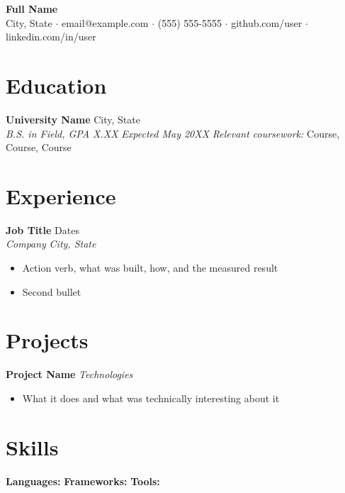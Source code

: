 \documentclass[letterpaper,10pt]{article}
\newcommand{\entry}[4]{\textbf{#1} \hfill #2 \\ \textit{#3} \hfill \textit{#4} \vspace{0.2em}}
\begin{document}
\begin{center}
{\LARGE \textbf{Full Name}}\\[0.3em]
City, State $\cdot$ email@example.com $\cdot$ (555) 555-5555 $\cdot$ github.com/user $\cdot$ linkedin.com/in/user
\end{center}

\section{Education}
\entry{University Name}{City, State}{B.S. in Field, GPA X.XX}{Expected May 20XX}
\textit{Relevant coursework:} Course, Course, Course

\section{Experience}
\entry{Job Title}{Dates}{Company}{City, State}
\begin{itemize}
  \item Action verb, what was built, how, and the measured result
  \item Second bullet
\end{itemize}

\section{Projects}
\textbf{Project Name} \hfill \textit{Technologies} \\
\begin{itemize}
  \item What it does and what was technically interesting about it
\end{itemize}

\section{Skills}
\textbf{Languages:} \quad \textbf{Frameworks:} \quad \textbf{Tools:}
\end{document}
